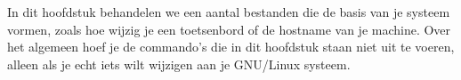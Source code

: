 In dit hoofdstuk behandelen we een aantal bestanden die de basis van je systeem vormen, zoals hoe wijzig je een toetsenbord of de hostname van je machine. Over het algemeen hoef je de commando's die in dit hoofdstuk staan niet uit te voeren, alleen als je echt iets wilt wijzigen aan je GNU/Linux systeem.

